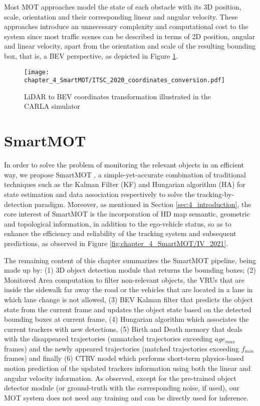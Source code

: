 Most \ac{MOT} approaches \cite{weng20203d, chiu2021probabilistic} model the state of each obstacle with its 3D position, scale, orientation and their corresponding linear and angular velocity. These approaches introduce an unnecessary complexity and computational cost to the system since most traffic scenes can be described in terms of 2D position, angular and linear velocity, apart from the orientation and scale of the resulting bounding box, that is, a \ac{BEV} perspective, as depicted in Figure \ref{fig:chapter_4_SmartMOT/ITSC_2020_coordinates_conversion}. 

\begin{figure}[h]
	\centering
	\texttt{[image: chapter\_4\_SmartMOT/ITSC\_2020\_coordinates\_conversion.pdf]}
	\caption{LiDAR to BEV coordinates transformation illustrated in the CARLA simulator}
	\label{fig:chapter_4_SmartMOT/ITSC_2020_coordinates_conversion}
\end{figure}

\section{SmartMOT}
\label{sec:4_smartmot}

In order to solve the problem of monitoring the relevant objects in an efficient way, we propose SmartMOT \cite{gomez2021smartmot}, a simple-yet-accurate combination of traditional techniques such as the Kalman Filter (KF) \cite{kalman1960new} and Hungarian algorithm (HA) \cite{kuhn1955hungarian} for state estimation and data association respectively to solve the tracking-by-detection paradigm. Moreover, as mentioned in Section \ref{sec:4_introduction}, the core interest of SmartMOT is the incorporation of HD map semantic, geometric and topological information, in addition to the ego-vehicle status, so as to enhance the efficiency and reliability of the tracking system and subsequent predictions, as observed in Figure \ref{fig:chapter_4_SmartMOT/IV_2021}. 

The remaining content of this chapter summarizes the SmartMOT pipeline, being made up by: (1) 3D object detection module that returns the bounding boxes; (2) Monitored Area computation to filter non-relevant objects, \eg the VRUs that are inside the sidewalk far away the road or the vehicles that are located in a lane in which lane change is not allowed, (3) BEV Kalman filter that predicts the object state from the current frame and updates the object state based on the detected bounding boxes at current frame, (4) Hungarian algorithm which associates the current trackers with new detections, (5) Birth and Death memory that deals with the disappeared trajectories (unmatched trajectories exceeding ${age_{max}}$ frames) and the newly appeared trajectories (matched trajectories exceeding ${f_{min}}$ frames) and finally (6) \ac{CTRV} model which performs short-term physics-based motion prediction of the updated trackers information using both the linear and angular velocity information. As observed, except for the pre-trained object detector module (or ground-truth with the corresponding noise, if used), our \ac{MOT} system does not need any training and can be directly used for inference.

